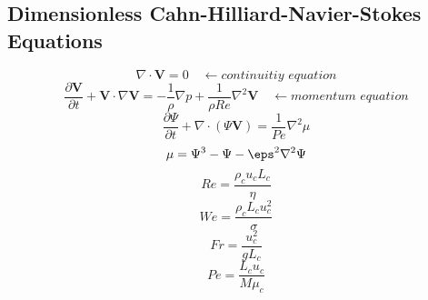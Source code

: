 \documentclass[12pt]{extarticle}
\begin{document}
\subsection*{Dimensionless Cahn-Hilliard-Navier-Stokes Equations}
\begin{equation}
\nabla \cdot  \textbf{V} = 0   \quad \leftarrow \textit{continuitiy equation}
\end{equation}
\begin{equation}
\frac{\partial \textbf{V}}{\partial t} + \textbf{V} \cdot \nabla \textbf{V} = - \frac{1}{\rho} \nabla p + \frac{1}{\rho Re} \nabla^{2} \textbf{V} \quad \leftarrow \textit{momentum equation}
\end{equation}
\begin{equation}
\frac{\partial \Psi}{\partial t} + \nabla \cdot \left(\Psi \textbf{V} \right) = \frac{1}{Pe} \nabla^{2} \mu
\end{equation}
\begin{equation}
\mu = \Psi^{3}-\Psi-\eps^{2}\nabla^{2}\Psi
\end{equation}
\begin{equation}
Re = \frac{\rho_{c} u_{c} L_{c}}{\eta}
\end{equation}
\begin{equation}
We = \frac{\rho_{c} L_{c} u_{c}^{2} }{\sigma}
\end{equation}
\begin{equation}
Fr = \frac{u_{c}^{2} }{g L_{c}}
\end{equation}
\begin{equation}
Pe = \frac{L_{c} u_{c}}{M \mu_{c}}
\end{equation}
\end{document}

